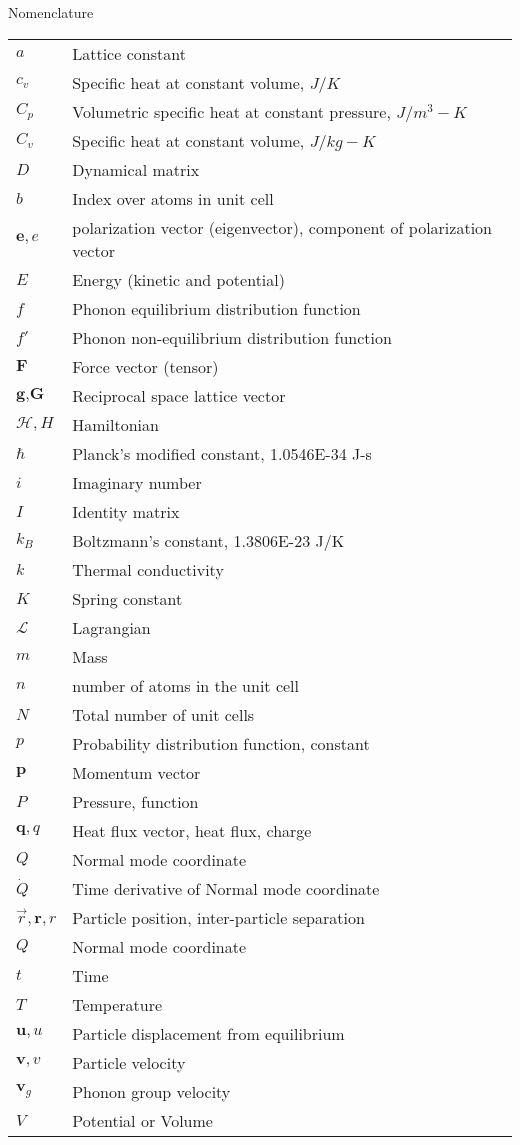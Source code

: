 \setlength{\LTleft}{0pt}
Nomenclature\\
\begin{longtable}{ l l }
$a$ & Lattice constant \\
$c_v$ & Specific heat at constant volume, $J/K$\\
$C_p$ & Volumetric specific heat at constant pressure, $J/m^3-K$\\
$C_v$ & Specific heat at constant volume, $J/kg-K$\\
$D$ & Dynamical matrix\\
$b$ & Index over atoms in unit cell \\
$\textbf{e},e$ & polarization vector (eigenvector), component of polarization vector\\
$E$ & Energy (kinetic and potential)\\
$f$ & Phonon equilibrium distribution function\\
$f'$ & Phonon non-equilibrium distribution function\\
$\textbf{F}$ & Force vector (tensor)\\
$\textbf{g},\textbf{G}$ & Reciprocal space lattice vector\\
$\mathscr{H}, H$ & Hamiltonian \\
$\hbar$ & Planck's modified constant, 1.0546E-34 J-s\\
$i$ & Imaginary number\\
$I$ & Identity matrix\\
$k_B$ & Boltzmann's constant, 1.3806E-23 J/K\\
$k$ & Thermal conductivity\\
$K$ & Spring constant\\
$\mathscr{L}$ & Lagrangian \\
$m$ & Mass\\
$n$ & number of atoms in the unit cell\\
$N$ & Total number of unit cells\\
$p$ & Probability distribution function, constant\\
$\textbf{p}$ & Momentum vector\\
$P$ & Pressure, function\\
$\textbf{q},q$ & Heat flux vector, heat flux, charge\\
$Q$ & Normal mode coordinate\\
$\dot{Q}$ & Time derivative of Normal mode coordinate\\
$\vec{r},\textbf{r},r$ & Particle position, inter-particle separation\\
$Q$ & Normal mode coordinate\\
$t$ & Time\\
$T$ & Temperature\\
$\textbf{u},u$ & Particle displacement from equilibrium\\
$\textbf{v},v$ & Particle velocity\\
$\textbf{v}_g$ & Phonon group velocity\\
$V$ & Potential or Volume\\
\end{longtable}


